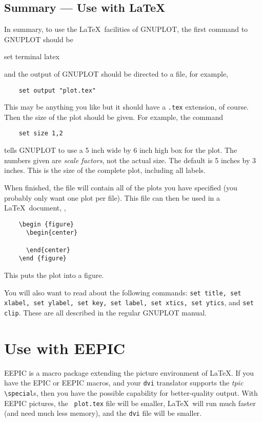 \subsection{Summary --- Use with \LaTeX}
In summary, to use the \LaTeX\ facilities of GNUPLOT, the first
command to GNUPLOT should be
\begin{syntax}
    set terminal latex
\end{syntax}
and the output of GNUPLOT should be directed to a file, for example,
\begin{verbatim}
    set output "plot.tex"
\end{verbatim}
This may be anything you like but it should have a {\tt .tex} extension,
of course. Then the size of the plot should be given. For example, the
command 
\begin{verbatim}
    set size 1,2
\end{verbatim}
tells GNUPLOT to use a 5 inch wide by 6 inch high box for the plot.
The numbers given are {\em scale factors}, not the actual size.  The
default is 5 inches by 3 inches.  This is the size of the complete
plot, including all labels.

When finished, the file will contain all of the plots you have
specified (you probably only want one plot per file). This file can
then be used in a \LaTeX\ document, \eg,

\singlespace
\begin{verbatim}
    \begin {figure}
      \begin{center}
        
      \end{center}
    \end {figure}
\end{verbatim}
\currentspace
This puts the plot into a figure. 

You will also want to read about the following commands: {\tt set
title, set xlabel, set ylabel, set key, set label, set xtics, set
ytics}, and {\tt set clip}.  These are all described in the regular
GNUPLOT manual.

\section{Use with EEPIC}
\label{s:eepic}
EEPIC is a macro package extending the picture environment of \LaTeX.
If you have the EPIC or EEPIC macros, and your {\tt dvi} translator
supports the {\em tpic\/} \verb+\special+s, then you have the possible
capability for better-quality output. With EEPIC pictures, the {\tt
plot.tex} file will be smaller, \LaTeX\ will run much faster (and need
much less memory), and the {\tt dvi} file will be smaller.

